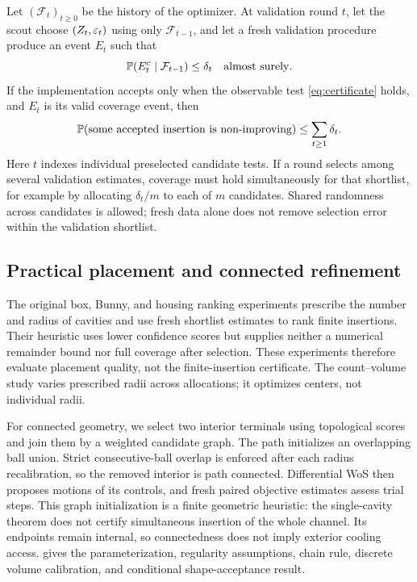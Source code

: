 \begin{proposition}
\label{prop:freshvalidation}
Let $(\mathcal F_t)_{t\ge0}$ be the history of the optimizer.  At validation
round $t$, let the scout choose $(Z_t,\varepsilon_t)$ using only
$\mathcal F_{t-1}$, and let a fresh validation procedure produce an event
$E_t$ such that
\begin{equation}
 \mathbb{P}(E_t^c\mid\mathcal F_{t-1})\le\delta_t
 \quad\text{almost surely}.
 \label{eq:conditionalcoverage}
\end{equation}
If the implementation accepts only when the observable test
\cref{eq:certificate} holds, and $E_t$ is its valid coverage event, then
\begin{equation}
 \mathbb{P}(\text{some accepted insertion is non-improving})
 \le\sum_{t\ge1}\delta_t.
 \label{eq:sequentialfamilywise}
\end{equation}
Here $t$ indexes individual preselected candidate tests. If a round selects
among several validation estimates, coverage must hold simultaneously for that
shortlist, for example by allocating $\delta_t/m$ to each of $m$ candidates.
Shared randomness across candidates is allowed; fresh data alone does not
remove selection error within the validation shortlist.
\end{proposition}

\subsection{Practical placement and connected refinement}

The original box, Bunny, and housing ranking experiments prescribe the number and radius of cavities and use fresh shortlist estimates to rank finite insertions. Their heuristic uses lower confidence scores but supplies neither a numerical remainder bound nor full coverage after selection. These experiments therefore evaluate placement quality, not the finite-insertion certificate. The count--volume study varies prescribed radii across allocations; it optimizes centers, not individual radii.

For connected geometry, we select two interior terminals using topological scores and join them by a weighted candidate graph. The path initializes an overlapping ball union. Strict consecutive-ball overlap is enforced after each radius recalibration, so the removed interior is path connected. Differential WoS then proposes motions of its controls, and fresh paired objective estimates assess trial steps. This graph initialization is a finite geometric heuristic: the single-cavity theorem does not certify simultaneous insertion of the whole channel. Its endpoints remain internal, so connectedness does not imply exterior cooling access.  gives the parameterization, regularity assumptions, chain rule, discrete volume calibration, and conditional shape-acceptance result.

